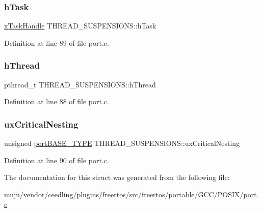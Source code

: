 \subsubsection{\texorpdfstring{h\+Task}{hTask}}
{\footnotesize\ttfamily \hyperlink{vendor_2ceedling_2plugins_2freertos_2vendor_2freertos_2include_2_free_r_t_o_s_8h_af7cd8f53b62f0c497b442b504c30f2ec}{x\+Task\+Handle} T\+H\+R\+E\+A\+D\+\_\+\+S\+U\+S\+P\+E\+N\+S\+I\+O\+N\+S\+::h\+Task}



Definition at line 89 of file port.\+c.

\mbox{\label{struct_t_h_r_e_a_d___s_u_s_p_e_n_s_i_o_n_s_a0587fb38462eacbd840ab28a08cb084d}} 
\subsubsection{\texorpdfstring{h\+Thread}{hThread}}
{\footnotesize\ttfamily pthread\+\_\+t T\+H\+R\+E\+A\+D\+\_\+\+S\+U\+S\+P\+E\+N\+S\+I\+O\+N\+S\+::h\+Thread}



Definition at line 88 of file port.\+c.

\mbox{\label{struct_t_h_r_e_a_d___s_u_s_p_e_n_s_i_o_n_s_a91b1dc4adc7949de7206346151c5b143}} 
\subsubsection{\texorpdfstring{ux\+Critical\+Nesting}{uxCriticalNesting}}
{\footnotesize\ttfamily unsigned \hyperlink{vendor_2ceedling_2plugins_2freertos_2vendor_2freertos_2portable_2_g_c_c_2_p_o_s_i_x_2portmacro_8h_a1ebe82d24d764ae4e352f7c3a9f92c01}{port\+B\+A\+S\+E\+\_\+\+T\+Y\+PE} T\+H\+R\+E\+A\+D\+\_\+\+S\+U\+S\+P\+E\+N\+S\+I\+O\+N\+S\+::ux\+Critical\+Nesting}



Definition at line 90 of file port.\+c.



The documentation for this struct was generated from the following file\+:\begin{DoxyCompactItemize}
\item 
muju/vendor/ceedling/plugins/freertos/src/freertos/portable/\+G\+C\+C/\+P\+O\+S\+I\+X/\hyperlink{vendor_2ceedling_2plugins_2freertos_2src_2freertos_2portable_2_g_c_c_2_p_o_s_i_x_2port_8c}{port.\+c}\end{DoxyCompactItemize}
